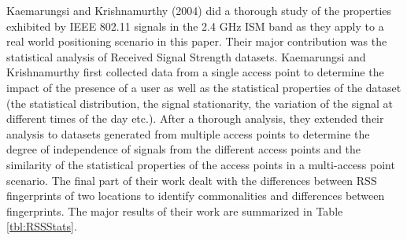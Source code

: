 Kaemarungsi and Krishnamurthy\cite{KStats} (2004)  did a thorough study of the properties exhibited by IEEE 802.11 signals in the 2.4 GHz ISM band as they apply to a real world positioning scenario in this paper. Their major contribution was the statistical analysis of Received Signal Strength datasets. Kaemarungsi and Krishnamurthy first collected data from a single access point to determine the impact of the presence of a user as well as the statistical properties of the dataset (the statistical distribution, the signal stationarity, the variation of the signal at different times of the day etc.). After a thorough analysis, they extended their analysis to datasets generated from multiple access points to determine the degree of independence of signals from the different access points and the similarity of the statistical properties of the access points in a multi-access point scenario. The final part of their work dealt with the differences between RSS fingerprints of two locations to identify commonalities and differences between fingerprints. The major results of their work are summarized in Table \ref{tbl:RSSStats}.

